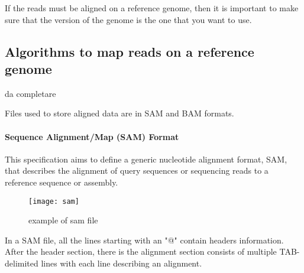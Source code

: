 If the reads must be aligned on a reference genome, then it is important to make sure that the
version of the genome is the one that you want to use.

\subsection{Algorithms to map reads on a reference genome}

da completare

Files used to store aligned data are in SAM and BAM formats.

\paragraph*{Sequence Alignment/Map (SAM) Format}
This specification aims to define a generic nucleotide alignment format, SAM,
that describes the alignment of query sequences or sequencing reads to a
reference sequence or assembly.

\begin{figure}[H]
  \centering
  \texttt{[image: sam]}
  \caption{example of sam file}
  \label{fig:sam}
\end{figure}

In a SAM file, all the lines starting with an "@" contain headers information.
After the header section, there is the alignment section consists of multiple TAB-delimited
lines with each line describing an alignment.
